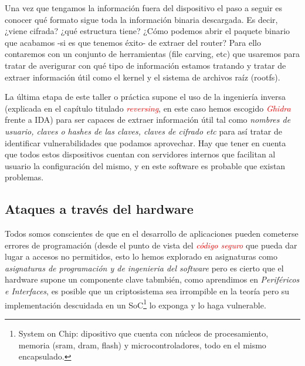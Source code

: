 \documentclass[12pt,a4paper, brazil]{article}
\begin{document}
Una vez que tengamos la información fuera del dispositivo el paso a seguir es conocer qué formato sigue toda la información binaria descargada. Es decir, ¿viene cifrada? ¿qué estructura tiene? ¿Cómo podemos abrir el paquete binario que acabamos -si es que tenemos éxito- de extraer del router? Para ello contaremos con un conjunto de herramientas (file carving, etc) que usaremos para tratar de averigurar con qué tipo de información estamos tratando y tratar de extraer información útil como el kernel y el sistema de archivos raíz (rootfs).  

La última etapa de este taller o práctica supone el uso de la ingeniería inversa (explicada en el capítulo titulado \emph{\textcolor{red}{reversing}}, en este caso hemos escogido \emph{\textcolor{red}{Ghidra}} frente a IDA) para ser capaces de extraer información útil tal como \emph{nombres de usuario, claves o hashes de las claves, claves de cifrado etc} para así tratar de identificar vulnerabilidades que podamos aprovechar. Hay que tener en cuenta que todos estos dispositivos cuentan con servidores internos que facilitan al usuario la configuración del mismo, y en este software es probable que existan problemas. 

\subsection{Ataques a través del hardware}
Todos somos conscientes de que en el desarrollo de aplicaciones pueden cometerse errores de programación (desde el punto de vista del \emph{\textcolor{red}{código seguro}} que pueda dar lugar a accesos no permitidos, esto lo hemos explorado en asignaturas como \emph{asignaturas de programación y de ingenieria del software} pero es cierto que el hardware supone un componente clave tabmbién, como aprendimos en \emph{Periféricos e Interfaces}, es posible que un criptosistema sea irrompible en la teoría pero su implementación descuidada en un SoC\footnote{System on Chip: dipositivo que cuenta con núcleos de procesamiento, memoria (sram, dram, flash) y microcontroladores, todo en el mismo encapsulado.} lo exponga y lo haga vulnerable. 
\end{document}
